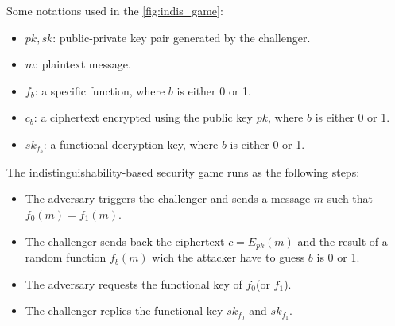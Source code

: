 Some notations used in the \autoref{fig:indis_game}:

\begin{itemize}
    \item \(pk,sk\): public-private key pair generated by the challenger.
    \item \(m\): plaintext message.
    \item \(f_b\): a specific function, where \(b\) is either 0 or 1.
    \item \(c_b\): a ciphertext encrypted using the public key \(pk\),
    where \(b\) is either 0 or 1.
    \item \(sk_{f_b}\): a functional decryption key, where \(b\) is either 0 or 1.
\end{itemize}

The indistinguishability-based security game runs as the following steps:

\begin{itemize}
    \item The adversary triggers the challenger and sends a message \(m\) such that
    \(f_0(m)=f_1(m)\).
    \item The challenger sends back the ciphertext \(c=E_{pk}(m)\) and the result of a
    random function \(f_b(m)\) wich the attacker have to guess \(b\) is 0 or 1.
    \item The adversary requests the functional key of \(f_0\)(or \(f_1\)).
    \item The challenger replies the functional key \(sk_{f_0}\) and \(sk_{f_1}\).
\end{itemize}

